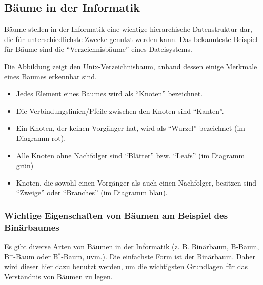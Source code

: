       \subsection{Bäume in der Informatik}
        Bäume stellen in der Informatik eine wichtige hierarchische Datenstruktur dar, die für unterschiedlichste Zwecke genutzt werden kann. Das bekannteste Beispiel für Bäume sind die \enquote{Verzeichnisbäume} eines Dateisystems.
        \begin{center}
        \end{center}
        Die Abbildung zeigt den Unix-Verzeichnisbaum, anhand dessen einige Merkmale eines Baumes erkennbar sind.
        \begin{itemize}
          \item Jedes Element eines Baumes wird als \enquote{Knoten} bezeichnet.
          \item Die Verbindungslinien/Pfeile zwischen den Knoten sind \enquote{Kanten}.
          \item Ein Knoten, der keinen Vorgänger hat, wird als \enquote{Wurzel} bezeichnet (im Diagramm rot).
          \item Alle Knoten ohne Nachfolger sind \enquote{Blätter} bzw. \enquote{Leafs} (im Diagramm grün)
          \item Knoten, die sowohl einen Vorgänger als auch einen Nachfolger, besitzen sind \enquote{Zweige} oder \enquote{Branches} (im Diagramm blau).
        \end{itemize}
        \subsubsection{Wichtige Eigenschaften von Bäumen am Beispiel des Binärbaumes}
          Es gibt diverse Arten von Bäumen in der Informatik (z. B. Binärbaum, B-Baum, B$^+$-Baum oder B$^*$-Baum, uvm.). Die einfachste Form ist der Binärbaum. Daher wird dieser hier dazu benutzt werden, um die wichtigsten Grundlagen für das Verständnis von Bäumen zu legen.

